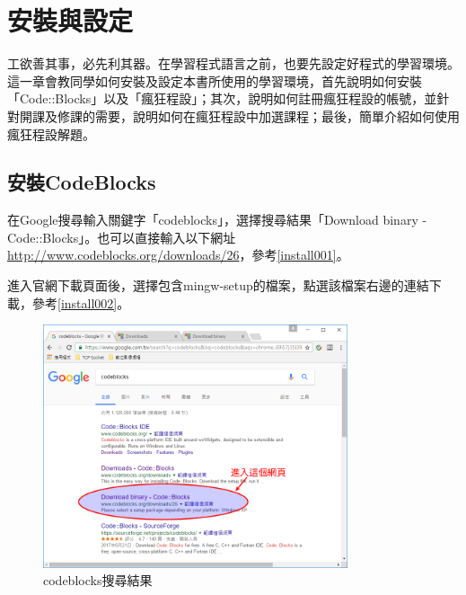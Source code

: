 \chapter{安裝與設定}

工欲善其事，必先利其器。在學習程式語言之前，也要先設定好程式的學習環境。這一章會教同學如何安裝及設定本書所使用的學習環境，首先說明如何安裝「Code::Blocks」以及「瘋狂程設」；其次，說明如何註冊瘋狂程設的帳號，並針對開課及修課的需要，說明如何在瘋狂程設中加選課程；最後，簡單介紹如何使用瘋狂程設解題。

\section{安裝CodeBlocks}
	在Google搜尋輸入關鍵字「codeblocks」，選擇搜尋結果「Download binary - Code::Blocks」。也可以直接輸入以下網址 \url{http://www.codeblocks.org/downloads/26}，參考\autoref{install001}。

	進入官網下載頁面後，選擇包含mingw-setup的檔案，點選該檔案右邊的連結下載，參考\autoref{install002}。

	\begin{figure}[H]
		\centering
		\includegraphics[width=0.8\textwidth]{fig/install_and_setting/install_001_searchCodeblocks}
		\caption{codeblocks搜尋結果}
		\label{install001}
	\end{figure}

